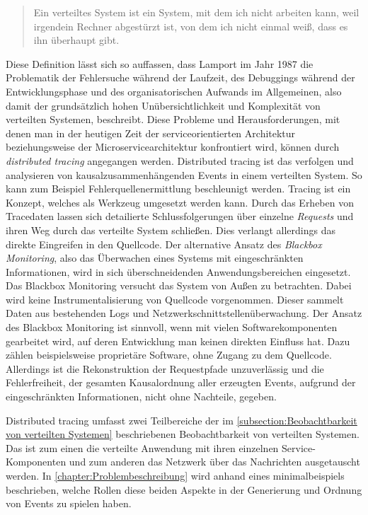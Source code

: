 \begin{quote}
	\cbstart
	Ein verteiltes System ist ein System, mit dem ich nicht arbeiten kann, weil irgendein Rechner abgestürzt ist, von dem ich nicht einmal weiß, dass es ihn überhaupt gibt.
	\cbend
\end{quote}


Diese Definition lässt sich so auffassen, dass Lamport im Jahr 1987 die Problematik der Fehlersuche während der Laufzeit, des Debuggings während der Entwicklungsphase und des organisatorischen Aufwands im Allgemeinen, also damit der grundsätzlich hohen Unübersichtlichkeit und Komplexität von verteilten Systemen, beschreibt. Diese Probleme und Herausforderungen, mit denen man in der heutigen Zeit der serviceorientierten Architektur beziehungsweise der Microservicearchitektur konfrontiert wird, können durch \emph{distributed tracing} angegangen werden. Distributed tracing ist das verfolgen und analysieren von kausalzusammenhängenden Events in einem verteilten System. So kann zum Beispiel Fehlerquellenermittlung beschleunigt werden. Tracing ist ein Konzept, welches als Werkzeug umgesetzt werden kann. Durch das Erheben von Tracedaten lassen sich detailierte Schlussfolgerungen über einzelne \emph{Requests} und ihren Weg durch das verteilte System schließen. Dies verlangt allerdings das direkte Eingreifen in den Quellcode. Der alternative Ansatz des \emph{Blackbox Monitoring}, also das Überwachen eines Systems mit eingeschränkten Informationen, wird in sich überschneidenden Anwendungsbereichen eingesetzt. Das Blackbox Monitoring versucht das System von Außen zu betrachten. Dabei wird keine Instrumentalisierung von Quellcode vorgenommen. Dieser sammelt Daten aus bestehenden Logs und Netzwerkschnittstellenüberwachung. Der Ansatz des Blackbox Monitoring ist sinnvoll, wenn mit vielen Softwarekomponenten gearbeitet wird, auf deren Entwicklung man keinen direkten Einfluss hat. Dazu zählen beispielsweise proprietäre Software, ohne Zugang zu dem Quellcode. Allerdings ist die Rekonstruktion der Requestpfade unzuverlässig und die Fehlerfreiheit, der gesamten Kausalordnung aller erzeugten Events, aufgrund der eingeschränkten Informationen, nicht ohne Nachteile, gegeben. 


Distributed tracing umfasst zwei Teilbereiche der im \cref{subsection:Beobachtbarkeit von verteilten Systemen} beschriebenen Beobachtbarkeit von verteilten Systemen. Das ist zum einen die verteilte Anwendung mit ihren einzelnen Service-Komponenten und zum anderen das Netzwerk über das Nachrichten ausgetauscht werden. In \cref{chapter:Problembeschreibung} wird anhand eines minimalbeispiels beschrieben, welche Rollen diese beiden Aspekte in der Generierung und Ordnung von Events zu spielen haben.


